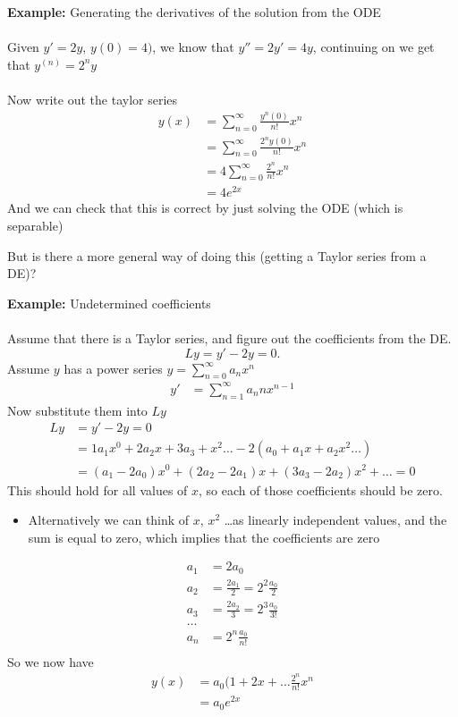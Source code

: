 \documentclass{article}
\begin{document}
\begin{example} 
\textbf{Example:} Generating the derivatives of the solution from the ODE \\
~\\
Given $y'=2y$, $y(0) = 4)$, we know that $y'' = 2y' = 4y$, continuing on we get that $y^{(n)} = 2^n y$ \\
~\\
Now write out the taylor series
\begin{align}
	y(x) &= \sum_{n=0}^{\infty} \frac{y^n(0)}{n!}x^n \\
	     &= \sum_{n=0}^{\infty} \frac{2^n y(0)}{n!}x^n  \\
	     &= 4\sum_{n=0}^{\infty} \frac{2^n}{n!}x^n \\
	     &= 4e^{2x}
\end{align}
And we can check that this is correct by just solving the ODE (which is separable)
\end{example}
But is there a more general way of doing this (getting a Taylor series from a DE)?
\begin{example} 
\textbf{Example:} Undetermined coefficients \\
~\\
Assume that there is a Taylor series, and figure out the coefficients from the DE. \\
\[
Ly = y' - 2y = 0
.\]  
Assume $y$ has a power series $y=\sum_{n=0}^{\infty} a_n x^n$
\begin{align}
	y' &= \sum_{n=1}^{\infty} a_n n x^{n-1}
\end{align}
Now substitute them into $Ly$
\begin{align}
	Ly &= y' - 2y = 0 \\
	   &= 1a_1x^0 + 2a_2x + 3a_3+x^2 \ldots - 2(a_0+ a_1x + a_2x^2 \ldots) \\
	   &= (a_1-2a_0)x^0 + (2a_2-2a_1)x + (3a_3-2a_2)x^2 + \ldots = 0
\end{align}
This should hold for all values of $x$, so each of those coefficients should be zero.
\begin{itemize}
	\item Alternatively we can think of $x$, $x^2$ \ldots as linearly independent values, and the sum is equal to zero, which implies that the coefficients are zero
\end{itemize}
\begin{align}
	a_1 &= 2a_0 \\
	a_2 &= \frac{2a_1}{2} = 2^2 \frac{a_0}{2} \\
	a_3 &= \frac{2a_2}{3} = 2^3 \frac{a_0}{3!} \\
	\ldots \\
	a_n &= 2^n \frac{a_0}{n!} \\
\end{align}
So we now have
\begin{align}
	y(x) &= a_0 (1 + 2x + \ldots \frac{2^n}{n!}x^n \\
	     &= a_0 e^{2x}
\end{align}
\end{example}
\end{document}
